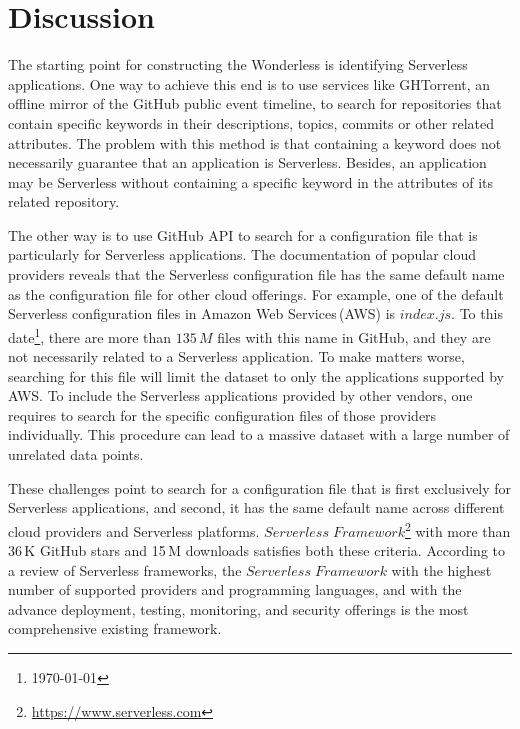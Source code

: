 \section{Discussion}
\label{discussion}
The starting point for constructing the Wonderless is identifying Serverless 
applications. One way to achieve this end is to use services like 
GHTorrent\cite{gousios2012ghtorrent}, 
an offline mirror of the GitHub public event timeline, to search for repositories 
that contain specific keywords in their descriptions, topics, commits or other 
related attributes. The problem with this method is that containing a keyword 
does not necessarily guarantee that an application is Serverless. Besides, an 
application may be Serverless without containing a specific keyword in the 
attributes of its related repository.

The other way is to use GitHub API to search for a configuration file that is 
particularly for Serverless applications. The documentation of popular cloud 
providers reveals that the Serverless configuration file has the same default 
name as the configuration file for other cloud offerings. 
For example, one of the default Serverless configuration files in Amazon 
Web Services\,(AWS) is $index.js$. To this date\footnote{\today}, there 
are more than $135 \, M$ files with this name in GitHub, and they are not 
necessarily related to a Serverless application. To make matters worse, 
searching for this file will limit the dataset to only the applications supported 
by AWS. To include the Serverless applications provided by other vendors, 
one requires to search for the specific configuration files of those providers 
individually. This procedure can lead to a massive dataset with a large number 
of unrelated data points.

These challenges point to search for a configuration file that is first exclusively 
for Serverless applications, and second, it has the same default name across 
different cloud providers and Serverless platforms. 
$Serverless \; Framework$\footnote{\url{https://www.serverless.com}} 
with more than 36\,K GitHub stars and 15\,M downloads satisfies both these 
criteria. According to a review of Serverless frameworks\cite{kritikos2018review}, 
the $Serverless \; Framework$ with the highest number of supported providers 
and programming languages, and with the advance deployment, testing, 
monitoring, and security offerings is the most comprehensive existing framework. 
